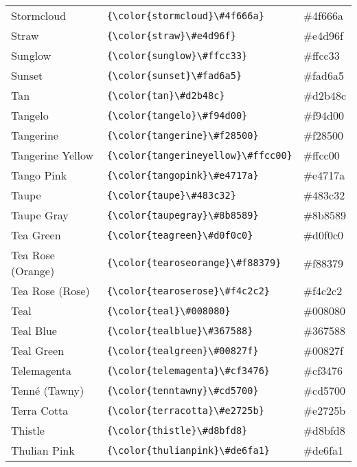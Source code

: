 \documentclass[9.5pt]{article}
\begin{document}
\begin{longtable}{l | l | l}
	Stormcloud & \verb!{\color{stormcloud}\#4f666a}! & {\color{stormcloud}\#4f666a}\\
	Straw & \verb!{\color{straw}\#e4d96f}! & {\color{straw}\#e4d96f}\\
	Sunglow & \verb!{\color{sunglow}\#ffcc33}! & {\color{sunglow}\#ffcc33}\\
	Sunset & \verb!{\color{sunset}\#fad6a5}! & {\color{sunset}\#fad6a5}\\
	Tan & \verb!{\color{tan}\#d2b48c}! & {\color{tan}\#d2b48c}\\
	Tangelo & \verb!{\color{tangelo}\#f94d00}! & {\color{tangelo}\#f94d00}\\
	Tangerine & \verb!{\color{tangerine}\#f28500}! & {\color{tangerine}\#f28500}\\
	Tangerine Yellow & \verb!{\color{tangerineyellow}\#ffcc00}! & {\color{tangerineyellow}\#ffcc00}\\
	Tango Pink & \verb!{\color{tangopink}\#e4717a}! & {\color{tangopink}\#e4717a}\\
	Taupe & \verb!{\color{taupe}\#483c32}! & {\color{taupe}\#483c32}\\
	Taupe Gray & \verb!{\color{taupegray}\#8b8589}! & {\color{taupegray}\#8b8589}\\
	Tea Green & \verb!{\color{teagreen}\#d0f0c0}! & {\color{teagreen}\#d0f0c0}\\
	Tea Rose (Orange) & \verb!{\color{tearoseorange}\#f88379}! & {\color{tearoseorange}\#f88379}\\
	Tea Rose (Rose) & \verb!{\color{tearoserose}\#f4c2c2}! & {\color{tearoserose}\#f4c2c2}\\
	Teal & \verb!{\color{teal}\#008080}! & {\color{teal}\#008080}\\
	Teal Blue & \verb!{\color{tealblue}\#367588}! & {\color{tealblue}\#367588}\\
	Teal Green & \verb!{\color{tealgreen}\#00827f}! & {\color{tealgreen}\#00827f}\\
	Telemagenta & \verb!{\color{telemagenta}\#cf3476}! & {\color{telemagenta}\#cf3476}\\
	Tenné (Tawny) & \verb!{\color{tenntawny}\#cd5700}! & {\color{tenntawny}\#cd5700}\\
	Terra Cotta & \verb!{\color{terracotta}\#e2725b}! & {\color{terracotta}\#e2725b}\\
	Thistle & \verb!{\color{thistle}\#d8bfd8}! & {\color{thistle}\#d8bfd8}\\
	Thulian Pink & \verb!{\color{thulianpink}\#de6fa1}! & {\color{thulianpink}\#de6fa1}\\

\end{longtable}
\end{document}
